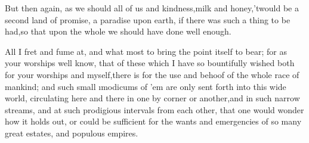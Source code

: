 \documentclass[twoside]{article}
\begin{document}
But then again, as we should all of us
and kindness,\tsk\!\tsk milk and honey,\tsh ’twould be a
second land of promise,\tsh\break
a paradise upon earth, if there was
such a thing to be had,\tsk so that upon the whole we should have
done well enough.

All I fret and fume at, and what most 
to bring the point itself to bear; for as your
worships well know, that of these 
which I have so bountifully wished both for your
worships and myself,\tsk there is\break
{}
for the use and behoof of the whole race of
mankind; and such small \i{modicums} of ’em are only sent forth
into this wide world, circulating here and there in one by corner
or another,\tsk and in such narrow streams, and at such prodigious
intervals from each other, that one would
wonder how it holds out,
or could be sufficient for the wants and emergencies of so many
great estates, and populous empires.
\end{document}
